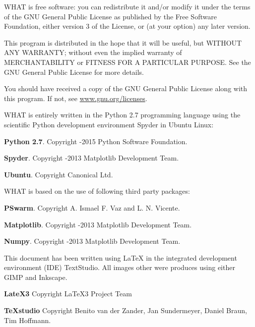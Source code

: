 \documentclass[WHATMANUAL.tex]{subfiles}
\begin{document}
WHAT is free software: you can redistribute it and/or modify it under the terms of the GNU General Public License as published by the Free Software Foundation, either version 3 of the License, or (at your option) any later version.

This program is distributed in the hope that it will be useful, but WITHOUT ANY WARRANTY; without even the implied warranty of MERCHANTABILITY or FITNESS FOR A PARTICULAR PURPOSE. See the GNU General Public License for more details.

You should have received a copy of the GNU General Public License along with this program. If not, see \url{www.gnu.org/licenses}.

\vspace{1cm}

\noindent
WHAT is entirely written in the Python 2.7 programming language using the scientific Python development environment Spyder in Ubuntu Linux:

\begin{description}
\item \textbf{Python 2.7}. Copyright \textcopyright{}-2015 Python Software Foundation.
\item \textbf{Spyder}. Copyright \textcopyright{}-2013 Matplotlib Development Team.
\item \textbf{Ubuntu}. Copyright \textcopyright{} Canonical Ltd. 
\end{description}

\vspace{0.5cm}

\noindent
WHAT is based on the use of following third party packages:
\begin{description}
\item \textbf{PSwarm}. Copyright \textcopyright{} A. Ismael F. Vaz and L. N. Vicente.
\item \textbf{Matplotlib}. Copyright \textcopyright{}-2013 Matplotlib Development Team.
\item \textbf{Numpy}. Copyright \textcopyright{}-2013 Matplotlib Development Team.
\end{description}

\noindent
This document has been written using LaTeX in the  integrated development environment (IDE) TextStudio. All images other were produces using either GIMP and Inkscape.
\begin{description}
\item \textbf{LateX3} Copyright \textcopyright\space LaTeX3 Project Team
\item \textbf{TeXstudio} Copyright \textcopyright\space Benito van der Zander, Jan Sundermeyer, Daniel Braun, Tim Hoffmann.
\end{description}
\end{document}
